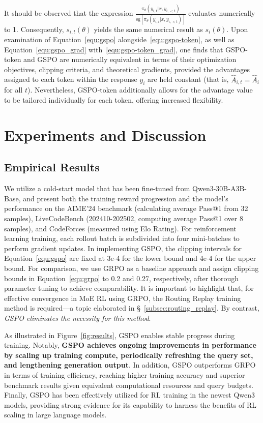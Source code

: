 It should be observed that the expression $\frac{ \pi_{\theta} (y_{i,t} | x, y_{i,<t}) }{ \mathrm{sg} \left[ \pi_{\theta} (y_{i,t} | x, y_{i,<t}) \right] }$ evaluates numerically to 1. Consequently, $s_{i,t}(\theta)$ yields the same numerical result as $s_{i}(\theta)$. Upon examination of Equation~\eqref{equ:gspo} alongside~\eqref{equ:gspo-token}, as well as Equation~\eqref{equ:gspo_grad} with~\eqref{equ:gspo-token_grad}, one finds that GSPO-token and GSPO are numerically equivalent in terms of their optimization objectives, clipping criteria, and theoretical gradients, provided the advantages assigned to each token within the response $y_i$ are held constant (that is, $\widehat{A}_{i,t} = \widehat{A}_{i}$ for all $t$). Nevertheless, GSPO-token additionally allows for the advantage value to be tailored individually for each token, offering increased flexibility.

\section{Experiments and Discussion}

\subsection{Empirical Results}

We utilize a cold-start model that has been fine-tuned from Qwen3-30B-A3B-Base, and present both the training reward progression and the model’s performance on the AIME'24 benchmark (calculating average Pass@1 from 32 samples), LiveCodeBench (202410-202502, computing average Pass@1 over 8 samples), and CodeForces (measured using Elo Rating). For reinforcement learning training, each rollout batch is subdivided into four mini-batches to perform gradient updates. In implementing GSPO, the clipping intervals for Equation~\eqref{equ:gspo} are fixed at 3e-4 for the lower bound and 4e-4 for the upper bound. For comparison, we use GRPO as a baseline approach and assign clipping bounds in Equation~\eqref{equ:grpo} to 0.2 and 0.27, respectively, after thorough parameter tuning to achieve comparability. It is important to highlight that, for effective convergence in MoE RL using GRPO, the Routing Replay training method is required—a topic elaborated in \S~\ref{subsec:routing_replay}. By contrast, \textit{GSPO eliminates the necessity for this method}.

As illustrated in Figure~\ref{fig:results}, GSPO enables stable progress during training. Notably, \textbf{GSPO achieves ongoing improvements in performance by scaling up training compute, periodically refreshing the query set, and lengthening generation output}. In addition, GSPO outperforms GRPO in terms of training efficiency, reaching higher training accuracy and superior benchmark results given equivalent computational resources and query budgets. Finally, GSPO has been effectively utilized for RL training in the newest Qwen3 models, providing strong evidence for its capability to harness the benefits of RL scaling in large language models.


